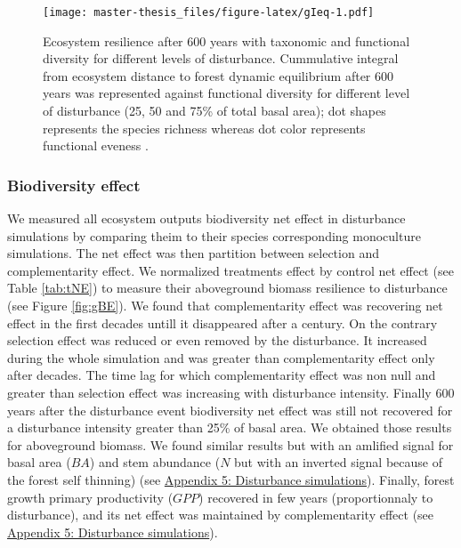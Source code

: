 \documentclass[12pt,]{article}
\theoremstyle{definition}
\theoremstyle{definition}
\theoremstyle{remark}
\begin{document}
\begin{figure}[htbp]
\centering
\texttt{[image: master-thesis\_files/figure-latex/gIeq-1.pdf]}
\caption{\label{fig:gIeq}Ecosystem resilience after 600 years with taxonomic
and functional diversity for different levels of disturbance.
Cummulative integral from ecosystem distance to forest dynamic
equilibrium after 600 years was represented against functional diversity
\citep[FDiv,][]{villeger_new_2008} for different level of disturbance
(25, 50 and 75\% of total basal area); dot shapes represents the species
richness whereas dot color represents functional eveness
\citep[FEve,][]{villeger_new_2008}.}
\end{figure}

\subsubsection{Biodiversity effect}\label{biodiversity-effect-1}

We measured all ecosystem outputs biodiversity net effect in disturbance
simulations by comparing theim to their species corresponding
monoculture simulations. The net effect was then partition between
selection and complementarity effect. We normalized treatments effect by
control net effect (see Table \ref{tab:tNE}) to measure their
aboveground biomass resilience to disturbance (see Figure
\ref{fig:gBE}). We found that complementarity effect was recovering net
effect in the first decades untill it disappeared after a century. On
the contrary selection effect was reduced or even removed by the
disturbance. It increased during the whole simulation and was greater
than complementarity effect only after decades. The time lag for which
complementarity effect was non null and greater than selection effect
was increasing with disturbance intensity. Finally 600 years after the
disturbance event biodiversity net effect was still not recovered for a
disturbance intensity greater than 25\% of basal area. We obtained those
results for aboveground biomass. We found similar results but with an
amlified signal for basal area (\(BA\)) and stem abundance (\(N\) but
with an inverted signal because of the forest self thinning) (see
\protect\hyperlink{appendix-5-disturbance-simulations}{Appendix 5:
Disturbance simulations}). Finally, forest growth primary productivity
(\(GPP\)) recovered in few years (proportionnaly to disturbance), and
its net effect was maintained by complementarity effect (see
\protect\hyperlink{appendix-5-disturbance-simulations}{Appendix 5:
Disturbance simulations}).
\end{document}
